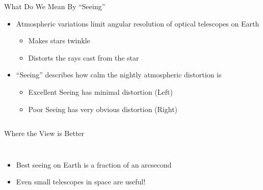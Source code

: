 \documentclass[pdf, aspectratio=169]{beamer}
\begin{document}
\begin{frame}{What Do We Mean By ``Seeing''}
  \begin{itemize}
	\item Atmospheric variations limit angular resolution of optical telescopes on Earth
	  \begin{itemize}
		\item Makes stars twinkle
		\item Distorts the rays cast from the star
	  \end{itemize}
	\item ``Seeing'' describes how calm the nightly atmospheric distortion is
	  \begin{itemize}
		\item Excellent Seeing has minimal distortion (Left)
		\item Poor Seeing has very obvious distortion (Right)
	  \end{itemize}
  \end{itemize}
  \begin{columns}
	\begin{center}
	\end{center}
	\begin{center}
	\end{center}
  \end{columns}
\end{frame}

\begin{frame}{Where the View is Better}
  \begin{columns}
	\begin{itemize}
	  \item Best seeing on Earth is a fraction of an arcsecond
	  \item Even small telescopes in space are useful!
	\end{itemize}
	\begin{center}
	\end{center}
  \end{columns}
\end{frame}
\end{document}
